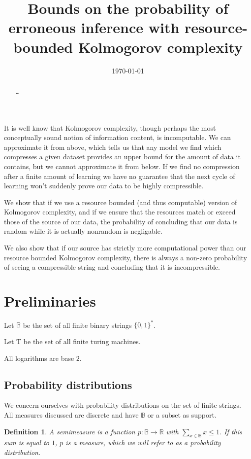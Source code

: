 \documentclass[10pt,a4paper,oneside]{article}
\title{Bounds on the probability of erroneous inference with resource-bounded Kolmogorov complexity}
\date{\today}
\newtheorem{dfn}{Definition}
\begin{document}
\maketitle

\begin{abstract}
\ldots
\end{abstract}

It is well know that Kolmogorov complexity, though perhaps the most conceptually sound notion of information content, is incomputable. We can approximate it from above, which tells us that any model we find which compresses a given dataset provides an upper bound for the amount of data it contains, but we cannot approximate it from below. If we find no compression after a finite amount of learning we have no guarantee that the next cycle of learning won't suddenly prove our data to be highly compressible. 

We show that if we use a resource bounded (and thus computable) version of Kolmogorov complexity, and if we ensure that the resources match or exceed those of the source of our data, the probability of concluding that our data is random while it is actually nonrandom is negligable.

We also show that if our source has strictly more computational power than our resource bounded Kolmogorov complexity, there is always a non-zero probability of seeing a compressible string and concluding that it is incompressible. 

\section*{Preliminaries}
Let $\mathbb B$ be the set of all finite binary strings $\{0,1\}^*$.

Let {\cal T} be the set of all finite turing machines.

All logarithms are base $2$.

\subsection*{Probability distributions}

We concern ourselves with probability distributions on the set of finite strings. All measures discussed are discrete and have $\mathbb B$ or a subset as support.

\begin{dfn}
A \emph{semimeasure} is a function $p : {\mathbb B} \rightarrow {\mathbb R}$ with $\sum_{x \in \mathbb B} x \leq 1$. If this sum is equal to $1$, $p$ is a \emph{measure}, which we will refer to as a probability distribution.
\end{dfn}
\end{document}
